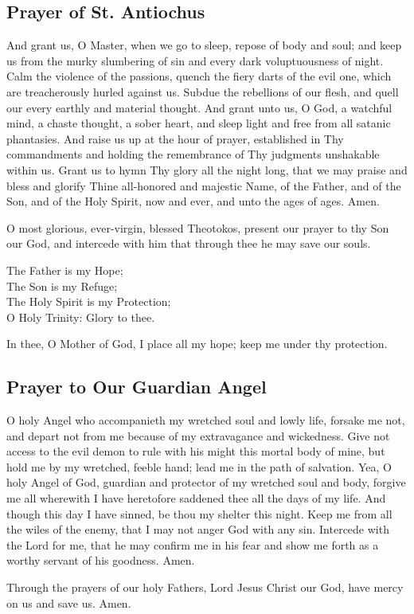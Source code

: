 \subsection{Prayer of St. Antiochus}

And grant us, O Master, when we go to sleep, repose of body and soul; and keep us from the murky slumbering of sin and every dark voluptuousness of night. Calm the violence of the passions, quench the fiery darts of the evil one, which are treacherously hurled against us. Subdue the rebellions of our flesh, and quell our every earthly and material thought. And grant unto us, O God, a watchful mind, a chaste thought, a sober heart, and sleep light and free from all satanic phantasies. And raise us up at the hour of prayer, established in Thy commandments and holding the remembrance of Thy judgments unshakable within us. Grant us to hymn Thy glory all the night long, that we may praise and bless and glorify Thine all-honored and majestic Name, of the Father, and of the Son, and of the Holy Spirit, now and ever, and unto the ages of ages. Amen.

O most glorious, ever-virgin, blessed Theotokos, present our prayer to thy Son our God, and intercede with him that through thee he may save our souls.

The Father is my Hope;  \\
The Son is my Refuge;  \\
The Holy Spirit is my Protection; \\
O Holy Trinity: Glory to thee.

In thee, O Mother of God, I place all my hope; keep me under thy protection.

\subsection{Prayer to Our Guardian Angel}

O holy Angel who accompanieth my wretched soul and lowly life, forsake me not, and depart not from me because of my extravagance and wickedness. Give not access to the evil demon to rule with his might this mortal body of mine, but hold me by my wretched, feeble hand; lead me in the path of salvation. Yea, O holy Angel of God, guardian and protector of my wretched soul and body, forgive me all wherewith I have heretofore saddened thee all the days of my life. And though this day I have sinned, be thou my shelter this night. Keep me from all the wiles of the enemy, that I may not anger God with any sin. Intercede with the Lord for me, that he may confirm me in his fear and show me forth as a worthy servant of his goodness. Amen.

Through the prayers of our holy Fathers, Lord Jesus Christ our God, have mercy on us and save us. Amen.

\cleardoublepage
